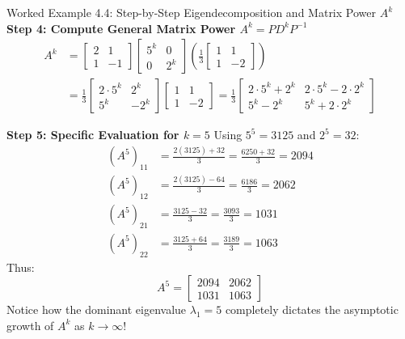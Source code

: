 \begin{examplebox}{Worked Example 4.4: Step-by-Step Eigendecomposition and Matrix Power $A^k$}
\textbf{Step 4: Compute General Matrix Power $A^k = P D^k P^{-1}$}
\begin{align*}
A^k &= \begin{bmatrix} 2 & 1 \\ 1 & -1 \end{bmatrix} \begin{bmatrix} 5^k & 0 \\ 0 & 2^k \end{bmatrix} \left( \frac{1}{3} \begin{bmatrix} 1 & 1 \\ 1 & -2 \end{bmatrix} \right) \\
&= \frac{1}{3} \begin{bmatrix} 2 \cdot 5^k & 2^k \\ 5^k & -2^k \end{bmatrix} \begin{bmatrix} 1 & 1 \\ 1 & -2 \end{bmatrix} = \frac{1}{3} \begin{bmatrix} 2 \cdot 5^k + 2^k & 2 \cdot 5^k - 2 \cdot 2^k \\ 5^k - 2^k & 5^k + 2 \cdot 2^k \end{bmatrix}
\end{align*}

\textbf{Step 5: Specific Evaluation for $k = 5$}
Using $5^5 = 3125$ and $2^5 = 32$:
\begin{align*}
(A^5)_{11} &= \frac{2(3125) + 32}{3} = \frac{6250 + 32}{3} = 2094 \\
(A^5)_{12} &= \frac{2(3125) - 64}{3} = \frac{6186}{3} = 2062 \\
(A^5)_{21} &= \frac{3125 - 32}{3} = \frac{3093}{3} = 1031 \\
(A^5)_{22} &= \frac{3125 + 64}{3} = \frac{3189}{3} = 1063
\end{align*}
Thus:
\begin{equation*}
A^5 = \begin{bmatrix} 2094 & 2062 \\ 1031 & 1063 \end{bmatrix}
\end{equation*}
Notice how the dominant eigenvalue $\lambda_1 = 5$ completely dictates the asymptotic growth of $A^k$ as $k \to \infty$!
\end{examplebox}

